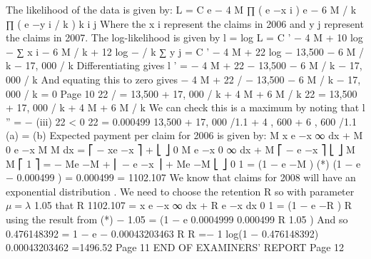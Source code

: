 \documentclass[a4paper,12pt]{article}
\begin{document}
The likelihood of the data is given by:
\lambda 
L = C \times  e − 4 \lambda  M \times  ∏ ( \lambda  e −\lambda  x i ) \times  e − 6 \lambda  M / k \times  ∏ ( e −\lambda  y i / k )
k
i
j
Where the x i represent the claims in 2006 and y j represent the claims in
2007.
The log-likelihood is given by
l = log L = C ' − 4 \lambda  M + 10 log \lambda  − \lambda  ∑ x i − 6 \lambda  M / k + 12 log \lambda  − \lambda  / k ∑ y j
= C ' − 4 \lambda  M + 22 log \lambda  − 13,500 \lambda  − 6 \lambda  M / k − 17, 000 \lambda  / k
Differentiating gives
l ' = − 4 M +
22
− 13,500 − 6 M / k − 17, 000 / k
\lambda 
And equating this to zero gives
− 4 M + 22 / \hat{\lambda} − 13,500 − 6 M / k − 17, 000 / k = 0
Page 10%
22 / \hat{\lambda} = 13,500 + 17, 000 / k + 4 M + 6 M / k
22
\hat{\lambda} =
13,500 + 17, 000 / k + 4 M + 6 M / k
We can check this is a maximum by noting that l '' = −
(iii)
22
< 0
22
= 0.000499
13,500 + 17, 000 /1.1 + 4 , 600 + 6 , 600 /1.1
(a) \hat{\lambda} =
(b) Expected payment per claim for 2006 is given by:
M
\int  x \lambda  e
−\lambda  x
∞
dx + M
0
\int  \lambda  e
−\lambda  x
M
M
dx = ⎡ − xe −\lambda  x ⎤ +
⎣
⎦ 0
M
\int  e
−\lambda  x
0
∞
dx + M ⎡ − e −\lambda  x ⎤
⎣
⎦ M
M
⎡ 1
⎤
= − Me −\lambda  M + ⎢ − e −\lambda  x ⎥ + Me −\lambda  M
⎣ \lambda 
⎦ 0
1
= (1 − e −\lambda  M ) (*)
(1 − e − 0.000499  )
=
0.000499
= 1102.107
We know that claims for 2008 will have an exponential distribution . We need to choose the retention R so
with parameter $\mu = \lambda$ 
1.05 
that
R
1102.107 = \int  x \mu e
−\mu x
∞
dx + R \int  \mu e −\mu x dx
0
1
= (1 − e −\mu R )
\mu
R
using the result from (*)
−
1.05 
=
(1 − e
0.0004999
0.000499 R
1.05  )
And so
0.476148392 = 1 − e − 0.00043203463 R
R =−
1
log(1 − 0.476148392)
0.00043203462
=1496.52
Page 11%
END OF EXAMINERS’ REPORT
Page 12
\end{document}
